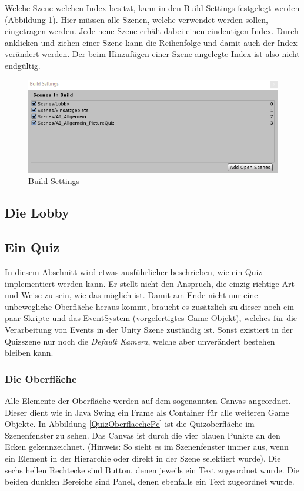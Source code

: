 Welche Szene welchen Index besitzt, kann in den Build Settings festgelegt werden (Abbildung \ref{BuildSettingsPic}). Hier müssen alle Szenen, welche verwendet werden sollen, eingetragen werden. Jede neue Szene erhält dabei einen eindeutigen Index. Durch anklicken und ziehen einer Szene kann die Reihenfolge und damit auch der Index verändert werden. Der beim Hinzufügen einer Szene angelegte Index ist also nicht endgültig.

\begin{figure}
\centering
\includegraphics[scale=0.85]{bilder/BuildSettings.PNG}
\caption{Build Settings}
\label{BuildSettingsPic}
\end{figure}

\subsection{Die Lobby}

\subsection{Ein Quiz}
In diesem Abschnitt wird etwas ausführlicher beschrieben, wie ein Quiz implementiert werden kann. Er stellt nicht den Anspruch, die einzig richtige Art und Weise zu sein, wie das möglich ist. Damit am Ende nicht nur eine unbewegliche Oberfläche heraus kommt, braucht es zusätzlich zu dieser noch ein paar Skripte und das EventSystem (vorgefertigtes Game Objekt), welches für die Verarbeitung von Events in der Unity Szene zuständig ist. Sonst existiert in der Quizszene nur noch die \textit{Default Kamera}, welche aber unverändert bestehen bleiben kann.

\subsubsection{Die Oberfläche}
Alle Elemente der Oberfläche werden auf dem sogenannten Canvas angeordnet. Dieser dient wie in Java Swing ein Frame als Container für alle weiteren Game Objekte. In Abbildung \ref{QuizOberflaechePc} ist die Quizoberfläche im Szenenfenster zu sehen. Das Canvas ist durch die vier blauen Punkte an den Ecken gekennzeichnet. (Hinweis: So sieht es im Szenenfenster immer aus, wenn ein Element in der Hierarchie oder direkt in der Szene selektiert wurde). Die sechs hellen Rechtecke sind Button, denen jeweils ein Text zugeordnet wurde. Die beiden dunklen Bereiche sind Panel, denen ebenfalls ein Text zugeordnet wurde. 

